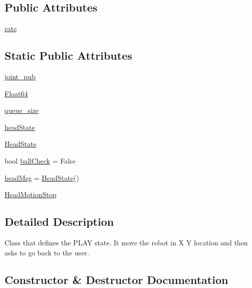 \subsection*{Public Attributes}
\begin{DoxyCompactItemize}
\item 
\hyperlink{classcommandManager_1_1Play_a34aba8df5dfec3560f194934b7e377ad}{rate}
\end{DoxyCompactItemize}
\subsection*{Static Public Attributes}
\begin{DoxyCompactItemize}
\item 
\hyperlink{classcommandManager_1_1Play_a0318d05c9cb612980001166e0a5e6db3}{joint\+\_\+pub}
\item 
\hyperlink{classcommandManager_1_1Play_ab8c1c484e196e9f92c68f46434eb944c}{Float64}
\item 
\hyperlink{classcommandManager_1_1Play_a228538235f3ed04c9ac82f4cfcf1cf1d}{queue\+\_\+size}
\item 
\hyperlink{classcommandManager_1_1Play_a534483b267540461c77b86f0e395bc4d}{head\+State}
\item 
\hyperlink{classcommandManager_1_1Play_a9fbbdb1ce8c11f60a9be52e5b76b8af7}{Head\+State}
\item 
bool \hyperlink{classcommandManager_1_1Play_a4de09112aa9b754ed23e1b61ee4cedec}{ball\+Check} = False
\item 
\hyperlink{classcommandManager_1_1Play_aaef8da5e59b3a582d9a7a84ab7fde1a6}{head\+Msg} = \hyperlink{classcommandManager_1_1Play_a9fbbdb1ce8c11f60a9be52e5b76b8af7}{Head\+State}()
\item 
\hyperlink{classcommandManager_1_1Play_a3784c8d006ea456b355d1f657c40edca}{Head\+Motion\+Stop}
\end{DoxyCompactItemize}


\subsection{Detailed Description}
\begin{DoxyVerb}Class that defines the PLAY state. 
 It move the robot in X Y location and then asks to go back to the user.\end{DoxyVerb}
 

\subsection{Constructor \& Destructor Documentation}
